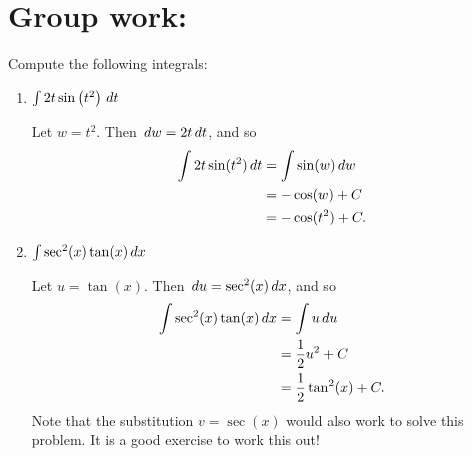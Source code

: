 \documentclass[nooutcomes]{ximera}
\begin{document}
		
		

	
	
	
	
	

\section*{Group work:}



\begin{problem}
Compute the following integrals:

	\begin{enumerate}
	
	\item  $\int 2t \sin \left( t^2 \right) \,d t$
		\begin{freeResponse}
		Let $w=t^2$.  Then $\,d w = 2t \,d t$, and so
			\begin{align*}
			\int 2t \sin(t^2) \,d t &= \int \sin(w) \,d w  \\
			&= - \cos(w) + C  \\
			&= - \cos(t^2) + C.
			\end{align*}
		\end{freeResponse}
		
		
		
	\item  $\int \sec^2(x) \tan(x) \,d x$
		\begin{freeResponse}
		Let $u = \tan(x)$.  Then $\,d u = \sec^2 (x) \,d x$, and so
			\begin{align*}
			\int \sec^2(x) \tan(x) \,d x &= \int u \,d u  \\
			&= \frac{1}{2} u^2 + C  \\
			&= \frac{1}{2} \tan^2(x) + C.
			\end{align*}
		Note that the substitution $v=\sec(x)$ would also work to solve this problem.  
		It is a good exercise to work this out!
		\end{freeResponse}
		
		
		
	\end{enumerate}
		
		
\end{problem}
\end{document}
